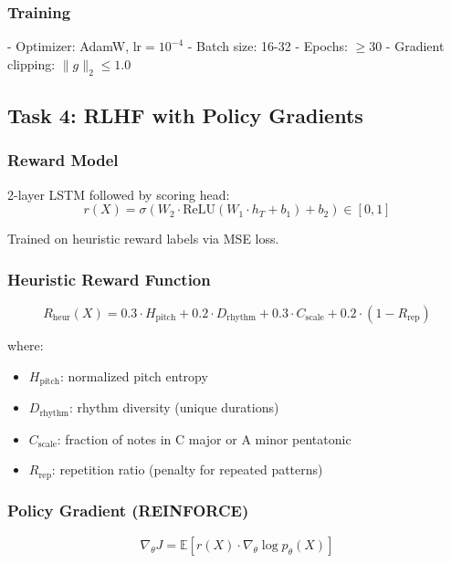 \documentclass[conference]{IEEEtran}
\begin{document}
\subsubsection{Training}
- Optimizer: AdamW, $\text{lr} = 10^{-4}$
- Batch size: 16-32
- Epochs: $\geq 30$
- Gradient clipping: $\|g\|_2 \leq 1.0$

\subsection{Task 4: RLHF with Policy Gradients}

\subsubsection{Reward Model}
2-layer LSTM followed by scoring head:
\begin{equation}
r(X) = \sigma(W_2 \cdot \text{ReLU}(W_1 \cdot h_T + b_1) + b_2) \in [0, 1]
\end{equation}

Trained on heuristic reward labels via MSE loss.

\subsubsection{Heuristic Reward Function}
\begin{equation}
R_{\text{heur}}(X) = 0.3 \cdot H_{\text{pitch}} + 0.2 \cdot D_{\text{rhythm}} + 0.3 \cdot C_{\text{scale}} + 0.2 \cdot (1 - R_{\text{rep}})
\end{equation}

where:
\begin{itemize}
\item $H_{\text{pitch}}$: normalized pitch entropy
\item $D_{\text{rhythm}}$: rhythm diversity (unique durations)
\item $C_{\text{scale}}$: fraction of notes in C major or A minor pentatonic
\item $R_{\text{rep}}$: repetition ratio (penalty for repeated patterns)
\end{itemize}

\subsubsection{Policy Gradient (REINFORCE)}
\begin{equation}
\nabla_\theta J = \mathbb{E}[r(X) \cdot \nabla_\theta \log p_\theta(X)]
\end{equation}
\end{document}
